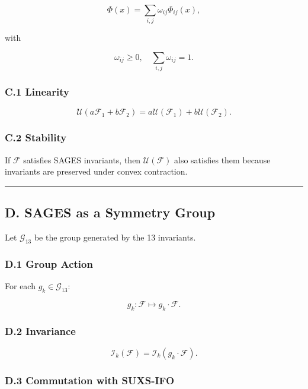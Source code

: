 \[
\Phi(x) = \sum_{i,j} \omega_{ij} \Phi_{ij}(x),
\]

with

\[
\omega_{ij} \ge 0, \quad \sum_{i,j} \omega_{ij} = 1.
\]

\subsubsection{C.1 Linearity}\label{c.1-linearity}

\[
\mathcal{U}(a\mathcal{F}_1 + b\mathcal{F}_2) = a\mathcal{U}(\mathcal{F}_1) + b\mathcal{U}(\mathcal{F}_2).
\]

\subsubsection{C.2 Stability}\label{c.2-stability}

If \(\mathcal{F}\) satisfies SAGES invariants, then \(\mathcal{U}(\mathcal{F})\) also satisfies them because invariants are preserved under convex contraction.

\begin{center}\rule{0.5\linewidth}{0.5pt}\end{center}

\subsection{D. SAGES as a Symmetry Group}\label{d.-sages-as-a-symmetry-group}

Let \(\mathcal{G}_{13}\) be the group generated by the 13 invariants.

\subsubsection{D.1 Group Action}\label{d.1-group-action}

For each \(g_k \in \mathcal{G}_{13}\):

\[
g_k : \mathcal{F} \mapsto g_k \cdot \mathcal{F}.
\]

\subsubsection{D.2 Invariance}\label{d.2-invariance}

\[
\mathcal{I}_k(\mathcal{F}) = \mathcal{I}_k(g_k \cdot \mathcal{F}).
\]

\subsubsection{D.3 Commutation with SUXS-IFO}\label{d.3-commutation-with-suxs-ifo}

